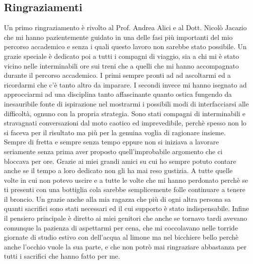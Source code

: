 \documentclass[12pt,a4paper]{book}
\begin{document}
	\newpage
	
	\subsection*{Ringraziamenti}
	Un primo ringraziamento è rivolto al Prof. Andrea Alici e al Dott. Nicolò Jacazio che mi hanno pazientemente guidato in una delle fasi più importanti del mio percorso accademico e senza i quali questo lavoro non sarebbe stato possibile. Un grazie speciale è dedicato poi a tutti i compagni di viaggio, sia a chi mi è stato vicino nelle interminabili ore sui treni che a quelli che mi hanno accompagnato durante il percorso accademico. I primi sempre pronti ad ad ascoltarmi ed a ricordarmi che c'è tanto altro da imparare. I secondi invece mi hanno isegnato ad approcciarmi ad una disciplina tanto affascinante quanto ostica fungendo da inesauribile fonte di ispirazione nel mostrarmi i possibili modi di interfacciarsi alle difficoltà, ognuno con la propria strategia. Sono stati compagni di interminabili e stravagnati conversazioni dal moto caotico ed imprevedibile, perchè spesso non lo si faceva per il risultato ma più per la genuina voglia di ragionare insieme. Sempre di fretta e sempre senza tempo eppure non si iniziava a lavorare seriamente senza prima aver proposto quell'improbabile argomento che ci bloccava per ore. Grazie ai miei grandi amici su cui ho sempre potuto contare anche se il tempo a loro dedicato non gli ha mai reso gustizia. A tutte quelle volte in cui non potevo uscire e a tutte le volte che mi hanno perdonato perchè se ti presenti con una bottiglia cola sarebbe semplicemente folle continuare a tenere il broncio. Un grazie anche alla mia ragazza che più di ogni altra persona sa quanti sacrifici sono stati necessari ed il cui supporto è stato indispensabile. Infine il pensiero principale è diretto ai miei genitori che anche se tornavo tardi avevano comunque la pazienza di aspettarmi per cena, che mi coccolavano nelle torride giornate di studio estivo con dell'acqua al limone ma nel bicchiere bello perchè anche l'occhio vuole la sua parte, e che non potrò mai ringraziare abbastanza per tutti i sacrifici che hanno fatto per me. %
	
\end{document}
